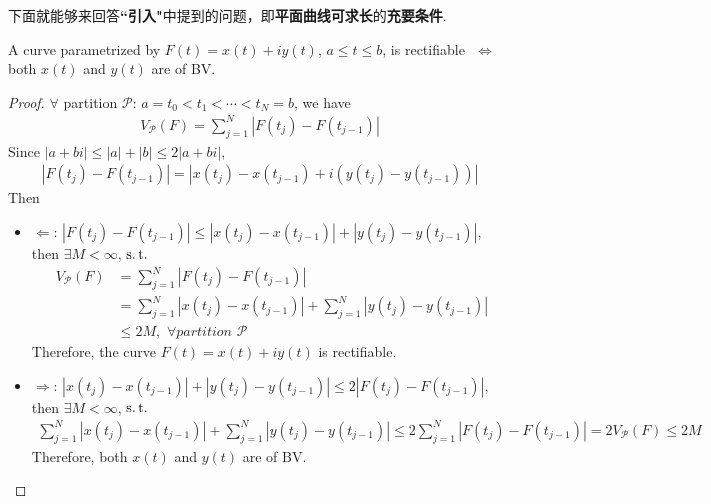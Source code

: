 	\vspace{2em}
	下面就能够来回答\textbf{``引入"}中提到的问题，即\textbf{平面曲线可求长}的\textbf{充要条件}.
	\begin{thm}\label{thm 4.4.1}
		A curve parametrized by $F(t) = x(t) + iy(t)$, $a \leq t \leq b$, is rectifiable $\,\, \Leftrightarrow \,\,$ both $x(t)$ and $y(t)$ are of BV.
		
		\vspace{2em}
		\begin{proof}
			$\forall$ partition $\mathcal{P}$: $a = t_0 < t_1 < \cdots < t_N = b$, we have
			\begin{align}
				V_{\mathcal{P}}(F) = \sum_{j = 1}^{N}{\left| F(t_j) - F(t_{j - 1}) \right|}
			\end{align}
			Since $\left| a + bi \right| \leq \left| a \right| + \left| b \right| \leq 2 \left| a + bi \right|$,
			\begin{align}
				\left| F(t_j) - F(t_{j - 1}) \right| = \left| x(t_j) - x(t_{j - 1}) + i \left( y(t_j) - y(t_{j - 1}) \right) \right|
			\end{align}
			Then
			\begin{itemize}
				\item $\Leftarrow$: $\left| F(t_j) - F(t_{j - 1}) \right| \leq \left| x(t_j) - x(t_{j - 1}) \right| + \left| y(t_j) - y(t_{j - 1}) \right|$, then $\exists M < \infty$, $\operatorname{s.t.}$
				\begin{align}
					V_{\mathcal{P}}(F) 
					&= \sum_{j = 1}^{N}{\left| F(t_j) - F(t_{j - 1}) \right|} \\
					&= \sum_{j = 1}^{N}{\left| x(t_j) - x(t_{j - 1}) \right|} + \sum_{j = 1}^{N}{\left| y(t_j) - y(t_{j - 1}) \right|} \\
					&\leq 2M , \,\, \forall partition \,\, \mathcal{P}
				\end{align}
				Therefore, the curve $F(t) = x(t) + iy(t)$ is rectifiable.
				
				\vspace{2em}
				
				\item $\Rightarrow$: $\left| x(t_j) - x(t_{j - 1}) \right| + \left| y(t_j) - y(t_{j - 1}) \right| \leq 2 \left| F(t_j) - F(t_{j - 1}) \right|$, then $\exists M < \infty$, $\operatorname{s.t.}$
				\begin{align}
					\sum_{j = 1}^{N}{\left| x(t_j) - x(t_{j - 1}) \right|} + \sum_{j = 1}^{N}{\left| y(t_j) - y(t_{j - 1}) \right|} 
					\leq 2 \sum_{j = 1}^{N}{\left| F(t_j) - F(t_{j - 1}) \right|} 
					= 2 V_{\mathcal{P}}(F) 
					\leq 2M
				\end{align}
				Therefore, both $x(t)$ and $y(t)$ are of BV.
			\end{itemize}
		\end{proof}
	\end{thm}


